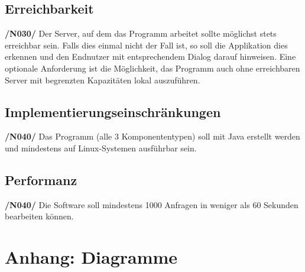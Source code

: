 \documentclass[11pt]{article} %
\begin{document}
\subsection{Erreichbarkeit}

\textbf{/N030/} Der Server, auf dem das Programm arbeitet sollte möglichst stets erreichbar sein. Falls dies einmal nicht der Fall ist, so soll die Applikation dies erkennen und den Endnutzer mit entsprechendem Dialog darauf hinweisen. Eine optionale Anforderung ist die Möglichkeit, das Programm auch ohne erreichbaren Server mit begrenzten Kapazitäten lokal auszuführen.

\subsection{Implementierungseinschränkungen}

\textbf{/N040/} Das Programm (alle 3 Komponententypen) soll mit Java erstellt werden und mindestens auf Linux-Systemen ausführbar sein.

\subsection{Performanz}

\textbf{/N040/} Die Software soll mindestens 1000 Anfragen in weniger als 60 Sekunden bearbeiten können.

\clearpage

\section{Anhang: Diagramme}

\begin{figure}

\end{figure}
\end{document}
